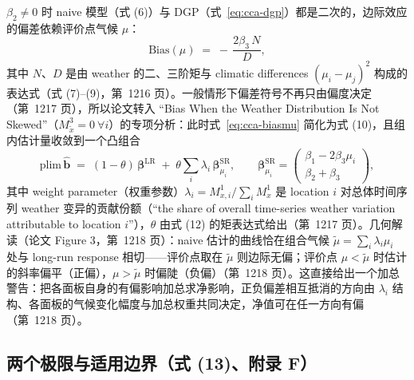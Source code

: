$\beta_2\neq 0$ 时 naive 模型（式 (6)）与 DGP（式~\ref{eq:cca-dgp}）都是二次的，边际效应的偏差依赖评价点气候 $\mu$：
\begin{equation}
\mathrm{Bias}(\mu) \;=\; -\,\frac{2\beta_3\,N}{D} ,
\label{eq:cca-biasmu}
\end{equation}
其中 $N$、$D$ 是由 weather 的二、三阶矩与 climatic differences $(\mu_i-\mu_j)^2$ 构成的表达式（式 (7)--(9)，第~1216 页）。一般情形下偏差符号不再只由偏度决定（第~1217 页），所以论文转入 ``Bias When the Weather Distribution Is Not Skewed''（$M^3_{\widetilde{x}}=0\ \forall i$）的专项分析\citep[第~1217 页]{merel2021climate}：此时式~\ref{eq:cca-biasmu} 简化为式 (10)，且组内估计量收敛到一个凸组合
\begin{equation}
\mathrm{plim}\,\widehat{\mathbf{b}} \;=\; (1-\theta)\,\boldsymbol{\beta}^{\mathrm{LR}} \;+\; \theta\sum_i \lambda_i\,\boldsymbol{\beta}^{\mathrm{SR}}_{\mu_i},
\qquad
\boldsymbol{\beta}^{\mathrm{SR}}_{\mu_i} = \begin{pmatrix} \beta_1 - 2\beta_3\mu_i \\ \beta_2+\beta_3 \end{pmatrix},
\label{eq:cca-combo}
\end{equation}
其中 weight parameter（权重参数）$\lambda_i = M^1_{x,i}\big/\sum_i M^1_x$ 是 location $i$ 对总体时间序列 weather 变异的贡献份额（``the share of overall time-series weather variation attributable to location $i$''\citep[第~1217 页]{merel2021climate}），$\theta$ 由式 (12) 的矩表达式给出（第~1217 页）。几何解读（论文 Figure 3，第~1218 页）：naive 估计的曲线恰在组合气候 $\widetilde{\mu} = \sum_i \lambda_i \mu_i$ 处与 long-run response 相切——评价点取在 $\widetilde{\mu}$ 则边际无偏；评价点 $\mu<\widetilde{\mu}$ 时估计的斜率偏平（正偏），$\mu>\widetilde{\mu}$ 时偏陡（负偏）（第~1218 页）。这直接给出一个加总警告：把各面板自身的有偏影响加总求净影响，正负偏差相互抵消的方向由 $\lambda_i$ 结构、各面板的气候变化幅度与加总权重共同决定，净值可在任一方向有偏（第~1218 页）。

\subsection{两个极限与适用边界（式 (13)、附录 F）}

